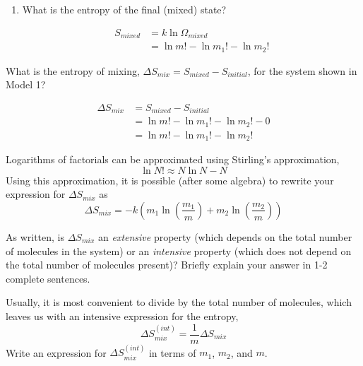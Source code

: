 \begin{activity}
\begin{ctqs}
\begin{enumerate}
				\item What is the entropy of the final (mixed) state?
				
					\begin{solution}[1in]
						\begin{align*}
							S_{mixed} &= k \ln \Omega_{mixed}\\
							&= \ln m! - \ln m_1! - \ln m_2!
						\end{align*}
					\end{solution}
				
				
			\end{enumerate}
		\question What is the entropy of mixing, $\Delta S_{mix} = S_{mixed} - S_{initial}$, for the system shown in Model 1?
				
					\begin{solution}[1in]
						\begin{align*}
							\Delta S_{mix} &= S_{mixed} - S_{initial}\\
							 &= \ln m! - \ln m_1! - \ln m_2! - 0 \\
							 &= \ln m! - \ln m_1! - \ln m_2!
						\end{align*}
					\end{solution}
\end{ctqs}

\begin{infobox}
	Logarithms of factorials can be approximated using Stirling's approximation,
	\begin{equation*}
		\ln N! \approx N \ln N - N \label{eqn:stirling}
	\end{equation*}
	Using this approximation, it is possible (after some algebra) to rewrite your expression for $\Delta S_{mix}$ as
	\begin{equation*}
		\Delta S_{mix} = -k\left(m_1 \ln\left(\frac{m_1}{m}\right) + m_2 \ln\left(\frac{m_2}{m}\right) \right)
	\end{equation*}
\end{infobox}

\begin{ctqs}
	\question As written, is $\Delta S_{mix}$ an \emph{extensive} property (which depends on the total number of molecules in the system) or an \emph{intensive} property (which does not depend on the total number of molecules present)?  Briefly explain your answer in 1-2 complete sentences.
	
	\question Usually, it is most convenient to divide by the total number of molecules, which leaves us with an intensive expression for the entropy,
		\begin{equation*}
			\Delta S_{mix}^{(int)} = \frac{1}{m} \Delta S_{mix}
		\end{equation*}
		Write an expression for $\Delta S_{mix}^{(int)}$ in terms of $m_1$, $m_2$, and $m$.
		

\end{ctqs}
\end{activity}
